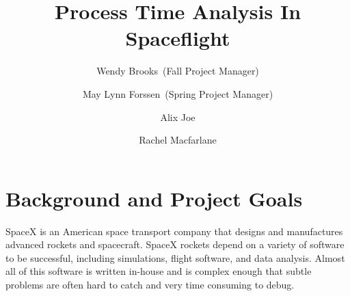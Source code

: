 \documentclass{hmcclinic}
\title{Process Time Analysis In Spaceflight}
\author{Wendy Brooks~(Fall Project Manager) \and May Lynn Forssen~(Spring Project Manager) \and Alix Joe \and
Rachel Macfarlane}
\begin{document}

\maketitle
 
\tableofcontents



\chapter{Background and Project Goals} %

SpaceX is an American space transport company that designs and manufactures
advanced rockets and spacecraft. SpaceX rockets depend on a variety of software
to be successful, including simulations, flight software, and data analysis.
Almost all of this software is written in-house and is complex enough that subtle
problems are often hard to catch and very time consuming to debug.

\end{document}
